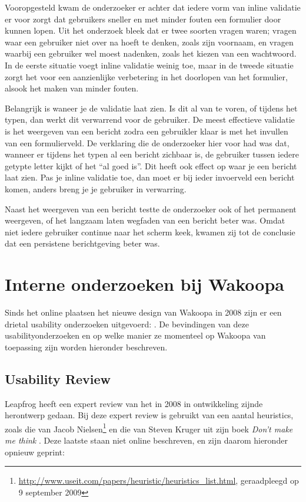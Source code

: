 \documentclass[a4paper, 10pt, pdftex]{report}
\begin{document}
    Vooropgesteld kwam de onderzoeker er achter  dat iedere vorm van inline validatie er voor zorgt dat gebruikers sneller en met minder fouten een formulier door kunnen lopen. Uit het onderzoek bleek dat er twee soorten vragen waren; vragen waar een gebruiker niet over na hoeft te denken, zoals zijn voornaam, en vragen waarbij een gebruiker wel moest nadenken, zoals het kiezen van een wachtwoord. In de eerste situatie voegt inline validatie weinig toe, maar in de tweede situatie zorgt het voor een aanzienlijke verbetering in het doorlopen van het formulier, alsook het maken van minder fouten.

    Belangrijk is waneer je de validatie laat zien. Is dit al van te voren, of tijdens het typen, dan werkt dit verwarrend voor de gebruiker. De meest effectieve validatie is het weergeven van een bericht zodra een gebruikler klaar is met het invullen van een formulierveld. De verklaring die de onderzoeker hier voor had was dat, wanneer er tijdens het typen al een bericht zichbaar is, de gebruiker tussen iedere getypte letter kijkt of het ``al goed is''. Dit heeft ook effect op waar je een bericht laat zien. Pas je inline validatie toe, dan moet er bij ieder invoerveld een bericht komen, anders breng je je gebruiker in verwarring.

    Naast het weergeven van een bericht testte de onderzoeker ook of het permanent weergeven, of het langzaam laten wegfaden van een bericht beter was. Omdat niet iedere gebruiker continue naar het scherm keek, kwamen zij tot de conclusie dat een persistene berichtgeving beter was.

  \section{Interne onderzoeken bij Wakoopa}
    Sinds het online plaatsen het nieuwe design van Wakoopa in 2008 zijn er een drietal usability onderzoeken uitgevoerd: \citet{Timmerman2008, Hoekman2008, Alfrink2008}. De bevindingen van deze usabilityonderzoeken en op welke manier ze momenteel op Wakoopa van toepassing zijn worden hieronder beschreven.

    \subsection{Usability Review \citet{Alfrink2008}}
    Leapfrog heeft een expert review van het in 2008 in ontwikkeling zijnde herontwerp gedaan. Bij deze expert review is gebruikt van een aantal heuristics, zoals die van Jacob Nielsen\footnote{\url{http://www.useit.com/papers/heuristic/heuristics\_list.html}, geraadpleegd op 9 september 2009} en die van Steven Kruger uit zijn boek \emph{Don't make me think} \citep{Krug2000}. Deze laatste staan niet online beschreven, en zijn daarom hieronder opnieuw geprint:
\end{document}
